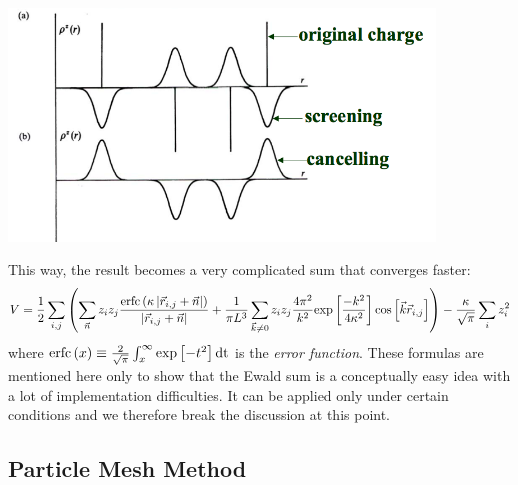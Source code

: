 \vspace{0.1cm}
\noindent
\begin{minipage}{\textwidth}
\begin{minipage}{.98\textwidth}
  \centering
  \includegraphics[width=0.85\textwidth]{pics/ewald_screening}
  \label{fig:ewald_screening}
\end{minipage}
\end{minipage}
\vspace{0.1cm}

This way, the result becomes a very complicated sum that converges faster:
$$
V=\frac{1}{2} \sum_{i,j}   \left(   \sum_{\vec{n}} z_iz_j \frac {\text{erfc}\left(\kappa \left|\vec{r}_{i,j}+\vec{n}\right|\right)}{\left|\vec{r}_{i,j} + \vec{n}\right|}  +  \frac{1}{\pi L^3} \sum_{\vec{k}\ne 0} z_iz_j \frac{4\pi^2}{k^2} \text{exp}\left[\frac{-k^2}{4\kappa^2}\right] \text{cos}\left[\vec{k}\vec{r}_{i,j}\right]    \right) -\frac{\kappa}{\sqrt{\pi}} \sum_i z^2_i
$$ where $\text{erfc}\left(x\right) \equiv \frac{2}{\sqrt{\pi}} \int_x^\infty \text{exp}\left[-t^2\right]\text{dt}$ is the \emph{error function}. These formulas are mentioned here only to show that the Ewald sum is a conceptually easy idea with a lot of implementation difficulties. It can be applied only under certain conditions and we therefore break the discussion at this point.




\subsection{Particle Mesh Method}

